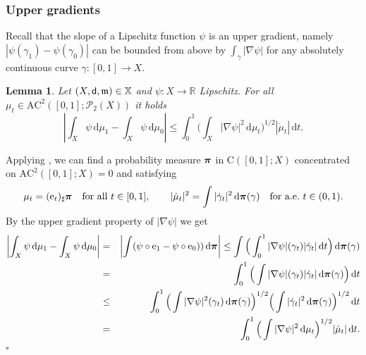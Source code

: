 \documentclass[reqno,11pt]{article}
\numberwithin{equation}{section}
\newcommand{\R}{\mathbb{R}}
\newcommand{\mm}{{\mbox{\boldmath$m$}}}
\newcommand{\ppi}{{\mbox{\boldmath$\pi$}}}
\newcommand{\sfd}{{\sf d}}
\renewcommand{\d}{{\mathrm d}}
\newcommand{\dt}{{\d t}}
\newcommand{\ProbabilitiesTwo}[1]{\mathscr P_2(#1)}     %
\newenvironment{proof}{\removelastskip\par\medskip   %
\noindent{\em Proof.}
\rm}{\penalty-20\null\hfill$\square$\par\medbreak}
\newtheorem{lemma}[theorem]{Lemma}
\newcommand{\probt}{\ProbabilitiesTwo}
\newcommand{\e}{{\rm{e}}}                           %
\newcommand{\X}{\mathbb X}
\newcommand{\AC}[3]{\mathrm{AC}^{#1}(#2;#3)}
\newcommand{\CC}[2]{\mathrm{C}(#1;#2)}
\renewcommand{\mm}{\mathfrak m}
\begin{document}
\subsubsection{Upper gradients}

Recall that the slope of a Lipschitz function $\psi$ is an upper
gradient, namely $|\psi(\gamma_1)-\psi(\gamma_0)|$ can be bounded
from above by $\int_\gamma|\nabla\psi|$ for any absolutely
continuous curve $\gamma:[0,1]\to X$.
%
\begin{lemma}
  \label{le:sug} Let $(X,\sfd,\mm)\in\X$ and $\psi:X\to\R$ Lipschitz. For all
  $\mu_t\in \AC2{[0,1]}{\probt{X}}$ it holds
  \begin{equation}
      \label{eq:3}
        \left|\int_X\psi\,\d\mu_1-\int_X\psi\,\d\mu_0\right|\le
        \int_0^1\Big(\int_X
        |\nabla\psi|^2\,\d\mu_t\Big)^{1/2}|\dot\mu_t|\,\dt.
    \end{equation}
  \end{lemma}
  \begin{proof}
    Applying \cite{Lisini07}, we can find a probability
    measure $\ppi$ in $\CC{[0,1]}X$ concentrated on
    $\AC2{[0,1]}X =0$ and satisfying
    \begin{equation}
      \label{eq:4}
      \mu_t=(\e_t)_\sharp\ppi\quad\text{for all $t\in [0,1]$},\qquad
      |\dot \mu_t|^2=\int |\dot\gamma_t|^2\,\d\ppi(\gamma)\quad
      \text{for a.e.\ }t\in (0,1).
    \end{equation}
    By the upper gradient property of $|\nabla\psi|$ we get
    \begin{eqnarray*}
    \biggl|\int_X\psi\,\d\mu_1-\int_X\psi\,\d\mu_0\biggr|
    &=&
    \biggl|\int(\psi\circ\e_1-\psi\circ\e_0))\,\d\ppi\biggr|
    \le\int
    \Big(\int_0^1|\nabla\psi|(\gamma_t)|\dot\gamma_t|\,\d t\Big)\,\d\ppi(\gamma)
    \\&=&
    \int_0^1\Big(\int|\nabla\psi|(\gamma_t)|\dot\gamma_t|\,\d\ppi(\gamma)\Big) \,\d t
    \\&\le&
    \int_0^1\Big(\int|\nabla\psi|^2(\gamma_t)\,\d\ppi(\gamma)\Big)^{1/2}
    \Big(\int|\dot\gamma_t|^2\,\d\ppi(\gamma)\Big)^{1/2}\,\d t\\
    &=&\int_0^1 \Big(\int|\nabla\psi|^2\,\d\mu_t\Big)^{1/2}
    |\dot\mu_t|\,\d t.
  \end{eqnarray*}
  \end{proof}
\end{document}
